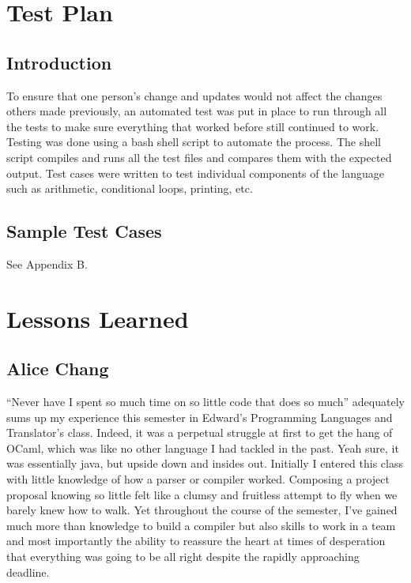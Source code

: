 \documentclass[11pt]{report}
\begin{document}
\chapter{Test Plan}
\section{Introduction}
To ensure that one person's change and updates would not affect the changes others made previously, an automated test was put in place to run through all the tests to make sure everything that worked before still continued to work. Testing was done using a bash shell script to automate the process. The shell script compiles and runs all the test files and compares them with the expected output. Test cases were written to test individual components of the language such as arithmetic, conditional loops, printing, etc.

\section{Sample Test Cases}
See Appendix B.

\chapter{Lessons Learned}
\section{Alice Chang}
``Never have I spent so much time on so little code that does so much'' adequately sums up my experience this semester in Edward’s Programming Languages and Translator’s class. Indeed, it was a perpetual struggle at first to get the hang of OCaml, which was like no other language I had tackled in the past. Yeah sure, it was essentially java, but upside down and insides out. Initially I entered this class with little knowledge of how a parser or compiler worked. Composing a project proposal knowing so little felt like a clumsy and fruitless attempt to fly when we barely knew how to walk. Yet throughout the course of the semester, I’ve gained much more than knowledge to build a compiler but also skills to work in a team and most importantly the ability to reassure the heart at times of desperation that everything was going to be all right despite the rapidly approaching deadline.
\end{document}
